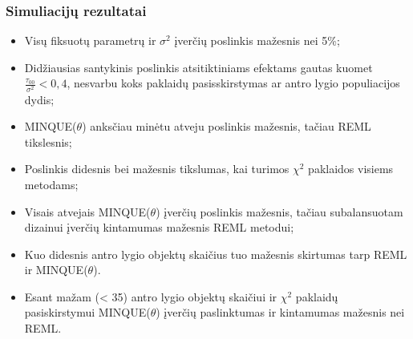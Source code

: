\documentclass[utf8,hyperref={unicode,pdftex}]{beamer}
\begin{document}
\begin{frame}
\frametitle{Simuliacijų rezultatai}
\begin{itemize}
\item Visų fiksuotų parametrų ir $\sigma^2$ įverčių poslinkis mažesnis nei 5\%;
\item Didžiausias santykinis poslinkis atsitiktiniams efektams gautas kuomet $\frac{\tau_{00}}{\sigma^2}<0,4$, nesvarbu koks paklaidų pasisskirstymas ar antro lygio populiacijos dydis;
\item MINQUE($\theta$) anksčiau minėtu atveju poslinkis mažesnis, tačiau REML tikslesnis;
\item Poslinkis didesnis bei mažesnis tikslumas, kai turimos $\chi^2$ paklaidos visiems metodams;
\item Visais atvejais MINQUE($\theta$) įverčių poslinkis mažesnis, tačiau subalansuotam dizainui įverčių kintamumas mažesnis REML metodui;
\item Kuo didesnis antro lygio objektų skaičius tuo mažesnis skirtumas tarp REML ir MINQUE($\theta$).
\item Esant mažam (< 35) antro lygio objektų skaičiui ir $\chi^2$ paklaidų pasiskirstymui MINQUE($\theta$) įverčių paslinktumas ir kintamumas mažesnis nei REML.
\end{itemize}
\end{frame}
\end{document}
